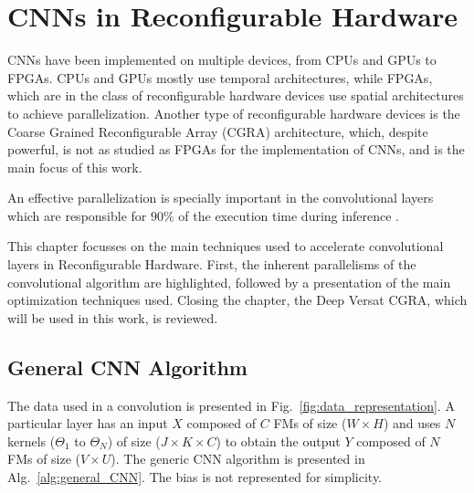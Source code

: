 
\chapter{CNNs in Reconfigurable Hardware}
\label{chapter:CNNs_on_FPGAs}

CNNs have been implemented on multiple devices, from CPUs and GPUs to
FPGAs. CPUs and GPUs mostly use temporal architectures, while FPGAs, which are
in the class of reconfigurable hardware devices use spatial architectures to
achieve parallelization. Another type of reconfigurable hardware devices is the
Coarse Grained Reconfigurable Array (CGRA) architecture, which, despite
powerful, is not as studied as FPGAs for the implementation of CNNs, and is the
main focus of this work.

An effective parallelization is specially important in the convolutional layers
which are responsible for $90\%$ of the execution time during inference
\cite{hal:accelCNNonFPGA}.

This chapter focusses on the main techniques used to accelerate convolutional
layers in Reconfigurable Hardware. First, the inherent parallelisms of the
convolutional algorithm are highlighted, followed by a presentation of the main
optimization techniques used. Closing the chapter, the Deep Versat CGRA, which
will be used in this work, is reviewed.

\section{General CNN Algorithm}
\label{sec:data_and_general_CNN_algorithm}
The data used in a convolution is presented in
Fig.~\ref{fig:data_representation}. A particular layer has an input $X$ composed
of $C$ FMs of size ($W\times H$) and uses $N$ kernels ($\Theta_1$ to $\Theta_N$)
of size ($J\times K \times C$) to obtain the output $Y$ composed of $N$ FMs of
size ($V\times U$). The generic CNN algorithm is presented in
Alg.~\ref{alg:general_CNN}. The bias is not represented for simplicity.

